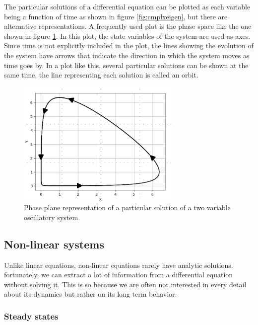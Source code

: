 \documentclass[12pt]{article}
\begin{document}
The particular solutions of a differential equation can be plotted as each variable being a function of time as shown in figure \ref{fig:cmplxeigen}, but there are alternative representations. A frequently used plot is the phase space like the one shown in figure \ref{fig:phase_plane}. In this plot, the state variables of the system are used as axes. Since time is not explicitly included in the plot, the lines showing the evolution of the system have arrows that indicate the direction in which the system moves as time goes by. In a plot like this, several particular solutions can be shown at the same time, the line representing each solution is called an orbit. 
\begin{figure}
	\begin{center}
		\includegraphics[width=0.7\textwidth]{phase_plane}
	\end{center}
	\caption{Phase plane representation of a particular solution of a two variable oscillatory system.}
	\label{fig:phase_plane}
\end{figure}

\subsection{Non-linear systems}

Unlike linear equations, non-linear equations rarely have analytic solutions. fortunately, we can extract a lot of information from a differential equation without solving it. This is so because we are often not interested in every detail about its dynamics but rather on its long term behavior.

\subsubsection{Steady states}
\end{document}
